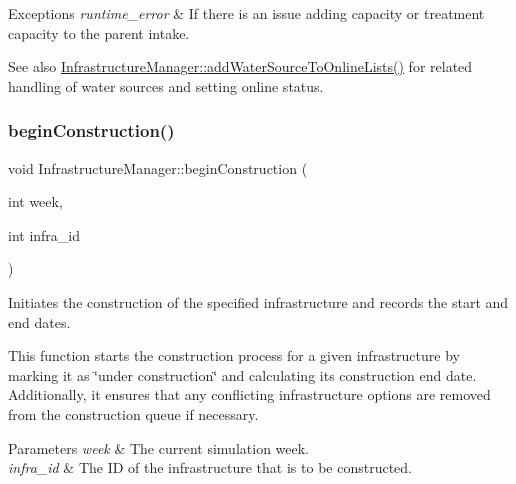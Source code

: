 \begin{DoxyExceptions}{Exceptions}
{\em runtime\+\_\+error} & If there is an issue adding capacity or treatment capacity to the parent intake.\\
\hline
\end{DoxyExceptions}
\begin{DoxySeeAlso}{See also}
\mbox{\hyperlink{classInfrastructureManager_ab66bdc91a6f60c6aea6ce0bf179df913}{Infrastructure\+Manager\+::add\+Water\+Source\+To\+Online\+Lists()}} for related handling of water sources and setting online status. 
\end{DoxySeeAlso}
\mbox{\label{classInfrastructureManager_a7d60e4abff73890519ced487c74f2675}} 
\subsubsection{\texorpdfstring{begin\+Construction()}{beginConstruction()}}
{\footnotesize\ttfamily void Infrastructure\+Manager\+::begin\+Construction (\begin{DoxyParamCaption}\item[{int}]{week,  }\item[{int}]{infra\+\_\+id }\end{DoxyParamCaption})}



Initiates the construction of the specified infrastructure and records the start and end dates. 

This function starts the construction process for a given infrastructure by marking it as \char`\"{}under construction\char`\"{} and calculating its construction end date. Additionally, it ensures that any conflicting infrastructure options are removed from the construction queue if necessary.


\begin{DoxyParams}{Parameters}
{\em week} & The current simulation week. \\
\hline
{\em infra\+\_\+id} & The ID of the infrastructure that is to be constructed.\\
\hline
\end{DoxyParams}

